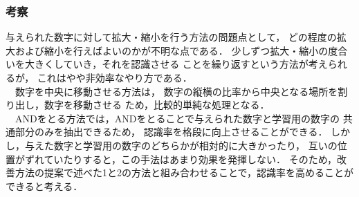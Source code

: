 \subsubsection{考察}
与えられた数字に対して拡大・縮小を行う方法の問題点として，
どの程度の拡大および縮小を行えばよいのかが不明な点である．
少しずつ拡大・縮小の度合いを大きくしていき，それを認識させる
ことを繰り返すという方法が考えられるが，
これはやや非効率なやり方である． \\
　数字を中央に移動させる方法は，
数字の縦横の比率から中央となる場所を割り出し，数字を移動させる
ため，比較的単純な処理となる． \\
　ANDをとる方法では，ANDをとることで与えられた数字と学習用の数字の
共通部分のみを抽出できるため，
認識率を格段に向上させることができる．
しかし，与えた数字と学習用の数字のどちらかが相対的に大きかったり，
互いの位置がずれていたりすると，この手法はあまり効果を発揮しない．
そのため，改善方法の提案で述べた1と2の方法と組み合わせることで，認識率を高めることができると考える．
